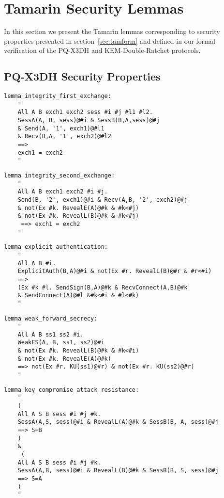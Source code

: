 \section{Tamarin Security Lemmas}
\label{ann:lemmas}
In this section we present the Tamarin lemmas corresponding to security properties presented in section~\ref{sec:tamform} and defined in our formal verification of the PQ-X3DH and KEM-Double-Ratchet protocols.

\subsection{PQ-X3DH Security Properties}

\begin{Verbatim}
lemma integrity_first_exchange:
    "
    All A B exch1 exch2 sess #i #j #l1 #l2.
    SessA(A, B, sess)@#i & SessB(B,A,sess)@#j
    & Send(A, '1', exch1)@#l1
    & Recv(B,A, '1', exch2)@#l2
    ==> 
    exch1 = exch2
    "
\end{Verbatim}

\begin{Verbatim}
lemma integrity_second_exchange:
    "
    All A B exch1 exch2 #i #j.
    Send(B, '2', exch1)@#i & Recv(A,B, '2', exch2)@#j
    & not(Ex #k. RevealE(A)@#k & #k<#j)
    & not(Ex #k. RevealL(B)@#k & #k<#j)
     ==> exch1 = exch2
    "
\end{Verbatim}

\begin{Verbatim}
lemma explicit_authentication:
    "
    All A B #i.
    ExplicitAuth(B,A)@#i & not(Ex #r. RevealL(B)@#r & #r<#i)
    ==> 
    (Ex #k #l. SendSign(B,A)@#k & RecvConnect(A,B)@#k 
    & SendConnect(A)@#l &#k<#i & #l<#k)
    "
\end{Verbatim}

\begin{Verbatim}
lemma weak_forward_secrecy:
    "
    All A B ss1 ss2 #i.
    WeakFS(A, B, ss1, ss2)@#i 
    & not(Ex #k. RevealL(B)@#k & #k<#i)
    & not(Ex #k. RevealE(A)@#k) 
    ==> not(Ex #r. KU(ss1)@#r) & not(Ex #r. KU(ss2)@#r)	
    "
\end{Verbatim}

\begin{Verbatim}
lemma key_compromise_attack_resistance:
    "
    (
    All A S B sess #i #j #k.
    SessA(A,S, sess)@#i & RevealL(A)@#k & SessB(B, A, sess)@#j
    ==> S=B
    )
    &
     (
    All A S B sess #i #j #k.
    SessA(A,B, sess)@#i & RevealL(B)@#k & SessB(B, S, sess)@#j
    ==> S=A
    )
    "
\end{Verbatim}

